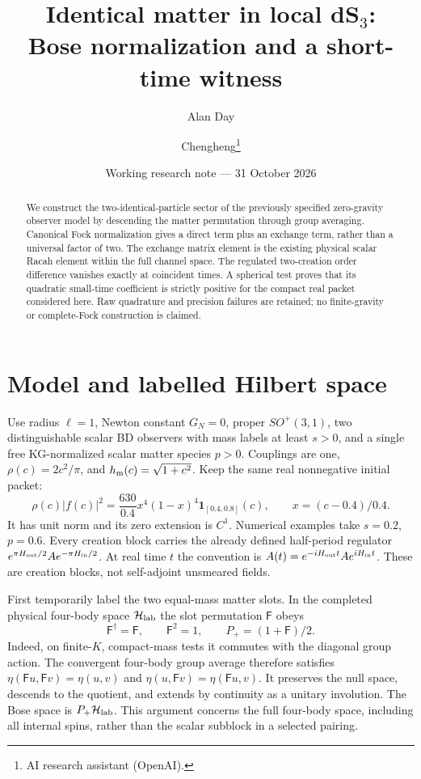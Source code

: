 \documentclass[11pt,a4paper]{article}
\title{Identical matter in local dS$_3$:\\Bose normalization and a short-time witness}
\author{Alan Day \and Chengheng\thanks{AI research assistant (OpenAI).}}
\date{Working research note --- 31 October 2026}
\newcommand{\HH}{\mathcal H}
\newcommand{\PP}{P_+}
\newcommand{\FF}{\mathsf F}
\newcommand{\hh}{h_{\rm m}}
\begin{document}
\maketitle
\begin{abstract}
We construct the two-identical-particle sector of the previously specified
zero-gravity observer model by descending the matter permutation through
group averaging. Canonical Fock normalization gives a direct term plus
an exchange term, rather than a universal factor of two. The exchange
matrix element is the existing physical scalar Racah element within the
full channel space. The regulated two-creation order difference vanishes
exactly at coincident times. A spherical test proves that its quadratic
small-time coefficient is strictly positive for the compact real packet
considered here. Raw quadrature and precision failures are retained;
no finite-gravity or complete-Fock construction is claimed.
\end{abstract}

\section{Model and labelled Hilbert space}
Use radius $\ell=1$, Newton constant $G_N=0$, proper $SO^+(3,1)$,
two distinguishable scalar BD observers with mass labels at least
$s>0$, and a single free KG-normalized scalar matter species $p>0$.
Couplings are one, $\rho(c)=2c^2/\pi$, and
$\hh(c)=\sqrt{1+c^2}$. Keep the same real nonnegative initial packet:
\[
 \rho(c)|f(c)|^2=\frac{630}{0.4}x^4(1-x)^4
 \mathbf1_{[0.4,0.8]}(c),\qquad x=(c-0.4)/0.4 .
\]
It has unit norm and its zero extension is $C^1$.
Numerical examples take $s=0.2$, $p=0.6$.
Every creation block carries the already defined half-period regulator
$e^{\pi H_{\rm out}/2}A e^{-\pi H_{\rm in}/2}$.
At real time $t$ the convention is
$A(t)=e^{-iH_{\rm out}t}A e^{iH_{\rm in}t}$.
These are creation blocks, not self-adjoint unsmeared fields.

First temporarily label the two equal-mass matter slots.
In the completed physical four-body space $\HH_{\rm lab}$ the slot
permutation $\FF$ obeys
\[
 \FF^\dagger=\FF,\qquad \FF^2=1,\qquad
 \PP=(1+\FF)/2 .
\]
Indeed, on finite-$K$, compact-mass tests it commutes with the diagonal
group action. The convergent four-body group average therefore satisfies
$\eta(\FF u,\FF v)=\eta(u,v)$ and
$\eta(u,\FF v)=\eta(\FF u,v)$.
It preserves the null space, descends to the quotient, and extends by
continuity as a unitary involution. The Bose space is $\PP\HH_{\rm lab}$.
This argument concerns the full four-body space, including all internal
spins, rather than the scalar subblock in a selected pairing.
\end{document}
